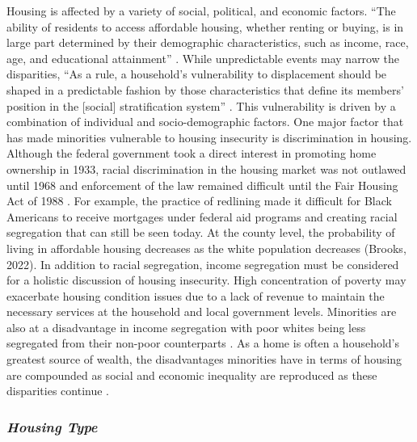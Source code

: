 Housing is affected by a variety of social, political, and economic factors. “The ability of residents to access affordable housing, whether renting or buying, is in large part determined by their demographic characteristics, such as income, race, age, and educational attainment” \citep[115]{yadavalli_comprehensive_2020}. While unpredictable events may narrow the disparities, “As a rule, a household’s vulnerability to displacement should be shaped in a predictable fashion by those characteristics that define its members’ position in the [social] stratification system” \citep[5]{lee_forced_2020}. This vulnerability is driven by a combination of individual and socio-demographic factors. One major factor that has made minorities vulnerable to housing insecurity is discrimination in housing. Although the federal government took a direct interest in promoting home ownership in 1933, racial discrimination in the housing market was not outlawed until 1968 and enforcement of the law remained difficult until the Fair Housing Act of 1988 \citep{sharp_emerging_2014}. For example, the practice of redlining made it difficult for Black Americans to receive mortgages under federal aid programs and creating racial segregation that can still be seen today. At the county level, the probability of living in affordable housing decreases as the white population decreases (Brooks, 2022). In addition to racial segregation, income segregation must be considered for a holistic discussion of housing insecurity. High concentration of poverty may exacerbate housing condition issues due to a lack of revenue to maintain the necessary services at the household and local government levels. Minorities are also at a disadvantage in income segregation with poor whites being less segregated from their non-poor counterparts \citep{lichter_ruralurban_2021}. As a home is often a household's greatest source of wealth, the disadvantages minorities have in terms of housing are compounded as social and economic inequality are reproduced as these disparities continue \citep{krivo_housing_2004}.  

\subsubsection{\textit{Housing Type}} 

